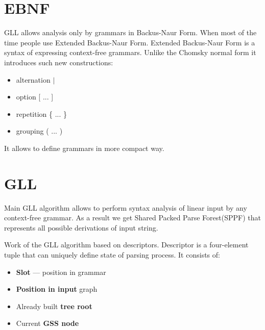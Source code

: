 \documentclass[runningheads,a4paper]{llncs}
\begin{document}

\section{EBNF}%

GLL allows analysis only by grammars in Backus-Naur Form. When most of the time people use Extended Backus-Naur Form.
Extended Backus-Naur Form is a syntax of expressing context-free grammars. Unlike the Chomsky normal form it 
introduces such new constructions: 
\begin{itemize}
    \item alternation $\mid$
    \item option [ ... ]
    \item repetition \{ ... \}
    \item grouping ( ... )
\end{itemize}
 
It allows to define grammars in more compact way.




\section{GLL}%

Main GLL algorithm\cite{scott2010gll} allows to perform syntax analysis of linear input by any context-free 
grammar. As a result we get Shared Packed Parse Forest(SPPF) that represents all possible derivations of input string.

Work of the GLL algorithm based on descriptors. Descriptor is a four-element tuple that can uniquely define state 
of parsing process. It consists of:
\begin{itemize}
    \item \textbf{Slot} --- position in grammar
    \item \textbf{Position in input} graph
    \item Already built \textbf{tree root}
    \item Current \textbf{GSS node}
\end{itemize}
\end{document}
